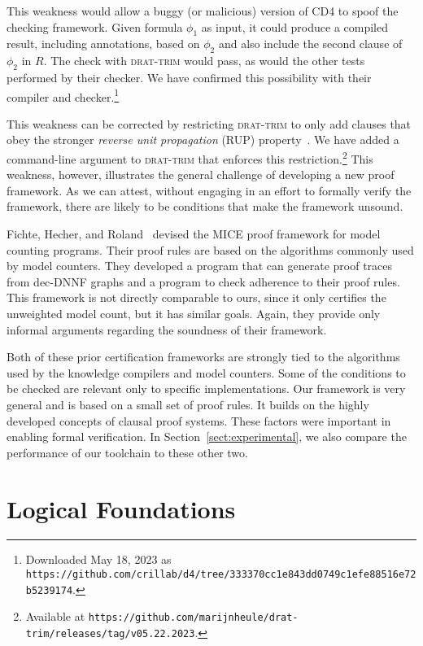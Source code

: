 \documentclass[twoside,11pt]{article}
\newcommand{\url}[1]{\texttt{#1}}
\newcommand{\progname}[1]{\textsc{#1}}
\newcommand{\cdfour}{\progname{CD4}}
\newcommand{\dtrim}{\progname{drat-trim}}
\begin{document}
This weakness would allow a buggy (or malicious) version of \cdfour{}
to spoof the checking framework.  Given formula $\phi_1$ as input, it
could produce a compiled result, including annotations, based on $\phi_2$ and also include the second clause of $\phi_2$ in $R$.
The check with \dtrim{} would pass, as would the other tests performed
by their checker.  We have confirmed this possibility with
their compiler and checker.\footnote{Downloaded May 18, 2023 as\\
\url{https://github.com/crillab/d4/tree/333370cc1e843dd0749c1efe88516e72b5239174}.}


This weakness can be corrected by restricting \dtrim{} to only add
clauses that obey the stronger \emph{reverse unit propagation} (RUP) property~\cite{goldberg,vangelder08_verifying_rup_proofs}.  We have added a
command-line argument to \dtrim{} that enforces this
restriction.\footnote{Available at
\url{https://github.com/marijnheule/drat-trim/releases/tag/v05.22.2023}.}  This weakness, however, illustrates the general challenge of
developing a new proof framework.
As we can attest,
without engaging in an effort to formally verify the framework, there are likely to be
conditions that make the framework unsound.

Fichte, Hecher, and Roland~\cite{fichte:sat:2022} devised the MICE
proof framework for model counting programs.  Their proof rules are
based on the algorithms commonly used by model counters.  They
developed a program that can generate proof traces from dec-DNNF
graphs and a program to check adherence to their proof rules.  This
framework is not directly comparable to ours, since it only certifies
the unweighted model count, but it has similar goals.
Again, they provide only  informal arguments
regarding the soundness of their framework.

Both of these prior certification frameworks are strongly tied to the
algorithms used by the knowledge compilers and model counters.  Some
of the conditions to be checked are relevant only to specific
implementations.    Our framework is very general and is based on a small set
of proof rules.  It builds on the highly developed
concepts of clausal proof systems.  These factors were important in enabling formal verification.
In Section~\ref{sect:experimental},
we also compare the performance of our toolchain to these other two.


\section{Logical Foundations}
\label{sect:logical:foundations}
\end{document}
